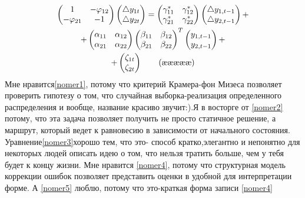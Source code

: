 \documentclass[12pt, a4paper]{article}
\begin{document}
\begin{multline*}\label{nomer5}
	\a\b=\c\d+\\
	+\e\f\g+\\
	+\h\tag{\ae\ae\ae\ae\ae}
\end{multline*}
Мне нравится\eqref{nomer1}, потому что критерий Крамера-фон Мизеса позволяет проверить гипотезу о том, что случайная выборка-реализация определенного распределения и вообще, название красиво звучит:).Я в восторге от \eqref{nomer2} потому, что эта задача позволяет получить не просто статичное решение, а маршрут, который ведет к равновесию в зависимости от начального состояния. Уравнение\eqref{nomer3}хорошо тем, что это- способ кратко,элегантно и непонятно для некоторых людей описать идею о том, что нельзя тратить больше, чем у тебя будет к концу жизни. Мне нравится \eqref{nomer4}, потому что структурная модель коррекции ошибок позволяет представить оценки в удобной для интерпретации форме. А \eqref{nomer5} люблю, потому что это-краткая форма записи  \eqref{nomer4}
\end{document}
